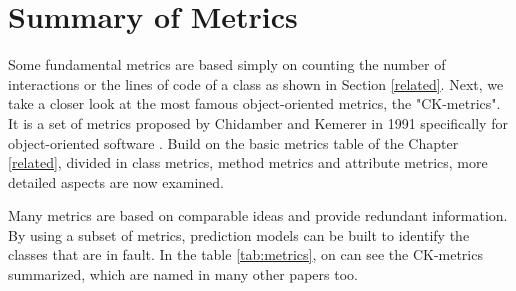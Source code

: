 \section{Summary of Metrics}\label{analysis}

Some fundamental metrics are based simply on counting the number of interactions or the lines of code of a class as shown in Section \ref{related}. Next, we take a closer look at the most famous object-oriented metrics, the "CK-metrics". It is a set of metrics proposed by Chidamber and Kemerer in 1991 specifically for object-oriented software \cite{b15chidamber1991towards}. Build on the basic metrics table of the Chapter \ref{related}, divided in class metrics, method metrics and attribute metrics, more detailed aspects are now examined. 

Many metrics are based on comparable ideas and provide redundant information. By using a subset of metrics, prediction models can be built to identify the classes that are in fault. In the table \ref{tab:metrics}, on can see the CK-metrics summarized, which are named in many other papers too.

